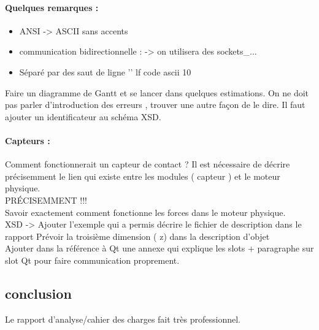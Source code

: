 \documentclass[a4paper,10pt]{article}
\begin{document}
\paragraph{Quelques remarques :}
\begin{itemize}
\item ANSI -> ASCII sans accents
\item communication bidirectionnelle : -> on utilisera des sockets_{...}
\item Séparé par des saut de ligne '\n' lf code ascii 10
\end{itemize}

Faire un diagramme de Gantt et se lancer dans quelques estimations. On
ne doit pas parler \og d'introduction des erreurs \fg, trouver une
autre façon de le dire. Il faut ajouter un identificateur au schéma XSD.
\paragraph{Capteurs : }
Comment fonctionnerait un capteur de contact ? Il est nécessaire de
décrire précisemment le lien qui existe entre les modules ( capteur )
et le moteur physique. \\
PRÉCISEMMENT !!!\\
Savoir exactement comment fonctionne les forces dans le moteur physique.\\
XSD -> Ajouter l'exemple qui a permis décrire le fichier de description dans le rapport
Prévoir la troisième dimension ( z) dans la description d'objet\\
Ajouter dans la référence à Qt une annexe qui explique les slots 
 + paragraphe sur slot Qt pour faire communication proprement.
 

\subsection*{conclusion}
Le rapport d'analyse/cahier des charges fait très professionnel. 
\end{document}
